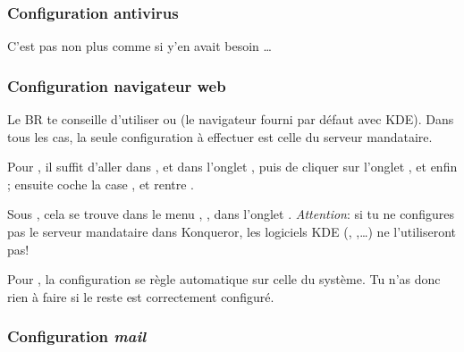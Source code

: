 \subsubsection{Configuration antivirus}

{C'est pas non plus comme si y'en avait besoin \dots}

%

\subsubsection{Configuration navigateur web}

 Le BR te conseille d'utiliser  ou
 (le navigateur fourni par d\'efaut avec KDE). Dans tous les cas, la seule
configuration \`a  effectuer est celle du serveur mandataire.

Pour , il suffit d'aller dans ,  et dans l'onglet , puis de cliquer sur l'onglet
, et enfin  ; ensuite coche la case , et rentre 
.

Sous , cela se trouve dans le menu , ,
dans l'onglet . \emph{Attention}: si tu ne configures pas le serveur mandataire dans Konqueror,
les logiciels KDE (, ,\dots) ne l'utiliseront pas!

Pour , la configuration se règle automatique sur celle du système. Tu n'as donc rien à faire si le reste est correctement configuré.


\pagebreak

\subsubsection{Configuration \emph{mail}}

